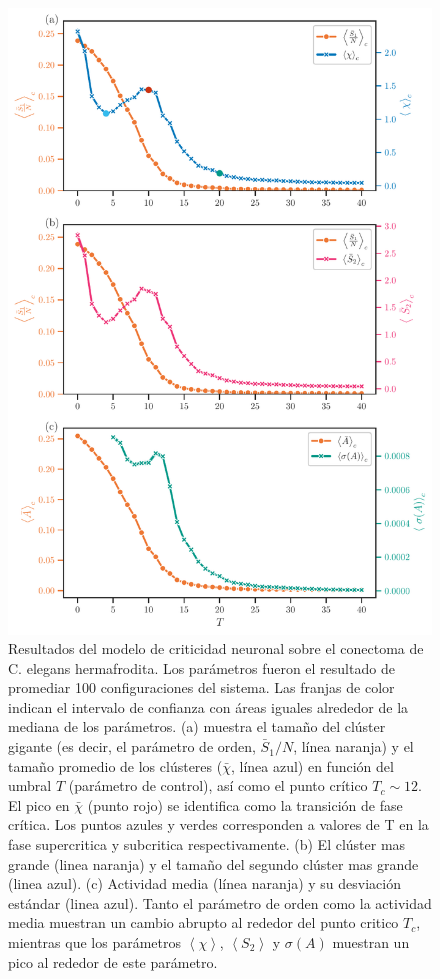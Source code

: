 \begin{figure}[h!]
	\centering\includegraphics[width=\imsize]{diagrama_fase_hermafrodita_completo.pdf}
	\caption[Resultados del modelo de criticidad neuronal  sobre el conectoma de C. elegans hermafrodita. ]{Resultados del modelo de criticidad neuronal  sobre el conectoma de C. elegans hermafrodita. Los parámetros fueron el resultado de promediar  100 configuraciones del sistema. Las franjas de color indican el intervalo de confianza con áreas iguales alrededor de la mediana de los parámetros. (a)  muestra el tamaño del clúster gigante (es decir, el parámetro de orden, $\bar{S}_1/N$, línea naranja) y el tamaño promedio de los clústeres ($\bar{\chi}$, línea azul) en función del umbral $T$ (parámetro de control), así como el punto crítico $T_c \sim 12$. El pico en $\bar{\chi}$ (punto rojo) se identifica como la transición de fase crítica. Los puntos azules y verdes corresponden a  valores de T en la fase supercritica y subcritica respectivamente. (b)  El clúster mas grande  (linea naranja) y el tamaño del segundo clúster mas grande  (linea azul). (c)   Actividad media (línea naranja) y su desviación estándar (linea azul).  Tanto el parámetro de orden  como la actividad media muestran un cambio abrupto al rededor del punto critico $T_c$, mientras que los parámetros  $\left\langle  \chi \right\rangle$, $\left\langle S_2 \right\rangle$ y $\sigma(A)$ muestran un pico al rededor de este parámetro. }\label{fig:diagrama_fase}
\end{figure}



